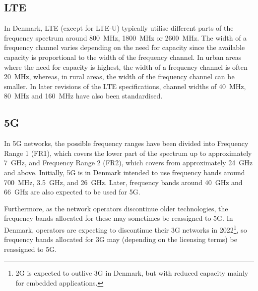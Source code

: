 \subsection{LTE}
In Denmark, LTE (except for LTE-U) typically utilise different parts of the frequency spectrum around 800~MHz, 1800~MHz or 2600~MHz. The width of a frequency channel varies depending on the need for capacity since the available capacity is proportional to the width of the frequency channel. In urban areas where the need for capacity is highest, the width of a frequency channel is often 20~MHz, whereas, in rural areas, the width of the frequency channel can be smaller. In later revisions of the LTE specifications, channel widths of 40~MHz, 80~MHz and 160~MHz have also been standardised.

\subsection{5G}
In 5G networks, the possible frequency ranges have been divided into Frequency Range 1 (FR1), which covers the lower part of the spectrum up to approximately 7~GHz, and Frequency Range 2 (FR2), which covers from approximately 24~GHz and above. Initially, 5G is in Denmark intended to use frequency bands around 700~MHz, 3.5~GHz, and 26~GHz. Later, frequency bands around 40~GHz and 66~GHz are also expected to be used for 5G.

Furthermore, as the network operators discontinue older technologies, the frequency bands allocated for these may sometimes be reassigned to 5G. In Denmark, operators are expecting to discontinue their 3G networks in 2022\footnote{2G is expected to outlive 3G in Denmark, but with reduced capacity mainly for embedded applications.}, so frequency bands allocated for 3G may (depending on the licensing terms) be reassigned to 5G.

